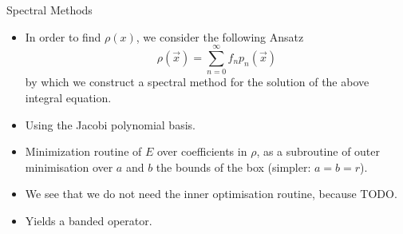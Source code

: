 \documentclass[aspectratio=169, hyperref={colorlinks=true}]{beamer}
\begin{document}
  \begin{frame}{Spectral Methods}
    \begin{itemize}
      \item In order to find $\rho(x)$, we consider the following Ansatz
            $$\rho(\vec{x}) = \sum_{n=0}^{\infty} f_n p_n(\vec{x})$$
            by which we construct a spectral method for the solution of the above integral equation.
      \item Using the Jacobi polynomial basis.
      \item Minimization routine of $E$ over coefficients in $\rho$, as a subroutine of outer minimisation over $a$ and $b$ the bounds of the box (simpler: $a = b = r$).
      \item We see that we do not need the inner optimisation routine, because TODO.
      \item Yields a banded operator.
    \end{itemize}
  \end{frame}
\end{document}

